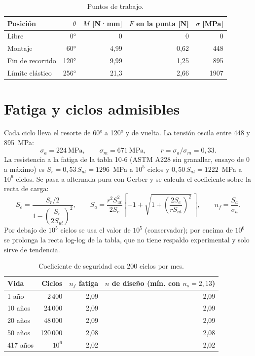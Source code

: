 \documentclass[11pt,a4paper]{article}
\begin{document}
\begin{table}[H]\centering\small
  \caption{Puntos de trabajo.}
  \begin{tabular}{l r r r r}
    \toprule
    Posición & $\theta$ & $M$ [N·mm] & $F$ en la punta [N] & $\sigma$ [MPa] \\
    \midrule
    Libre & 0° & 0 & 0 & 0 \\
    Montaje & 60° & 4,99 & 0,62 & 448 \\
    Fin de recorrido & 120° & 9,99 & 1,25 & 895 \\
    Límite elástico & 256° & 21,3 & 2,66 & 1907 \\
    \bottomrule
  \end{tabular}
\end{table}

\section{Fatiga y ciclos admisibles}
Cada ciclo lleva el resorte de 60° a 120° y de vuelta. La tensión oscila entre 448 y 895~MPa:
\[
  \sigma_a = 224~\text{MPa}, \qquad \sigma_m = 671~\text{MPa}, \qquad r = \sigma_a/\sigma_m = 0{,}33 .
\]
La resistencia a la fatiga de la tabla 10-6 (ASTM A228 sin granallar, ensayo de 0 a máximo) es
$S_r = 0{,}53\,S_{ut} = 1296$~MPa a $10^5$ ciclos y $0{,}50\,S_{ut} = 1222$~MPa a $10^6$ ciclos.
Se pasa a alternada pura con Gerber y se calcula el coeficiente sobre la recta de carga:
\[
  S_e = \frac{S_r/2}{1 - \left(\dfrac{S_r}{2 S_{ut}}\right)^2}, \qquad
  S_a = \frac{r^2 S_{ut}^2}{2 S_e}\left[-1 + \sqrt{1 + \left(\frac{2 S_e}{r S_{ut}}\right)^2}\,\right],
  \qquad n_f = \frac{S_a}{\sigma_a}.
\]
Por debajo de $10^5$ ciclos se usa el valor de $10^5$ (conservador); por encima de $10^6$ se prolonga la
recta log-log de la tabla, que no tiene respaldo experimental y solo sirve de tendencia.

\begin{table}[H]\centering\small
  \caption{Coeficiente de seguridad con 200 ciclos por mes.}
  \begin{tabular}{l r r r}
    \toprule
    Vida & Ciclos & $n_f$ fatiga & $n$ de diseño (mín. con $n_s = 2{,}13$) \\
    \midrule
    1 año & 2\,400 & 2,09 & 2,09 \\
    10 años & 24\,000 & 2,09 & 2,09 \\
    20 años & 48\,000 & 2,09 & 2,09 \\
    50 años & 120\,000 & 2,08 & 2,08 \\
    417 años & $10^6$ & 2,02 & 2,02 \\
    \bottomrule
  \end{tabular}
\end{table}
\end{document}
